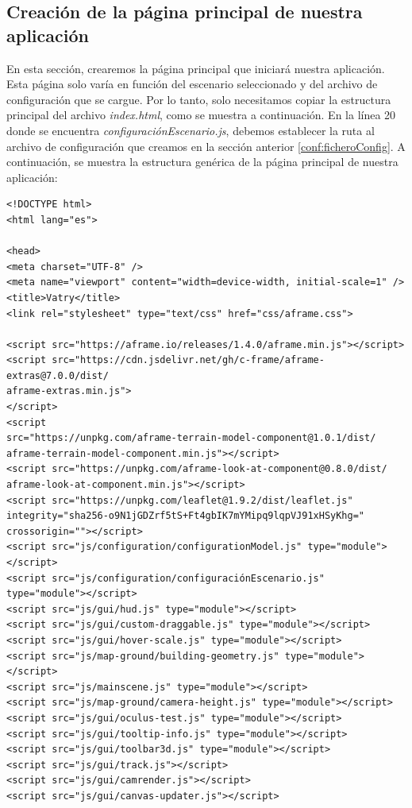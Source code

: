 \documentclass[a4paper, 11pt]{book}
\begin{document}
\subsection{Creación de la página principal de nuestra aplicación}
En esta sección, crearemos la página principal que iniciará nuestra aplicación. Esta página solo varía en función del escenario seleccionado y del archivo de configuración que se cargue. Por lo tanto, solo necesitamos copiar la estructura principal del archivo \emph{index.html}, como se muestra a continuación. 
En la línea 20 donde se encuentra \emph{configuraciónEscenario.js}, debemos establecer la ruta al archivo de configuración que creamos en la sección anterior \ref{conf:ficheroConfig}. 
A continuación, se muestra la estructura genérica de la página principal de nuestra aplicación:
\label{conf:index}
\begin{verbatim}
<!DOCTYPE html>
<html lang="es">

<head>
<meta charset="UTF-8" />
<meta name="viewport" content="width=device-width, initial-scale=1" />
<title>Vatry</title>
<link rel="stylesheet" type="text/css" href="css/aframe.css">

<script src="https://aframe.io/releases/1.4.0/aframe.min.js"></script>
<script src="https://cdn.jsdelivr.net/gh/c-frame/aframe-extras@7.0.0/dist/
aframe-extras.min.js">
</script>
<script
src="https://unpkg.com/aframe-terrain-model-component@1.0.1/dist/
aframe-terrain-model-component.min.js"></script>
<script src="https://unpkg.com/aframe-look-at-component@0.8.0/dist/
aframe-look-at-component.min.js"></script>
<script src="https://unpkg.com/leaflet@1.9.2/dist/leaflet.js"
integrity="sha256-o9N1jGDZrf5tS+Ft4gbIK7mYMipq9lqpVJ91xHSyKhg=" crossorigin=""></script>
<script src="js/configuration/configurationModel.js" type="module"></script>
<script src="js/configuration/configuraciónEscenario.js" type="module"></script>
<script src="js/gui/hud.js" type="module"></script>
<script src="js/gui/custom-draggable.js" type="module"></script>
<script src="js/gui/hover-scale.js" type="module"></script>
<script src="js/map-ground/building-geometry.js" type="module"></script>
<script src="js/mainscene.js" type="module"></script>
<script src="js/map-ground/camera-height.js" type="module"></script>
<script src="js/gui/oculus-test.js" type="module"></script>
<script src="js/gui/tooltip-info.js" type="module"></script>
<script src="js/gui/toolbar3d.js" type="module"></script>
<script src="js/gui/track.js"></script>
<script src="js/gui/camrender.js"></script>
<script src="js/gui/canvas-updater.js"></script>


\end{verbatim}
\end{document}
